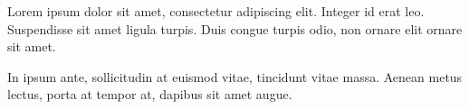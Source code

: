 \documentclass{article}
\begin{document}
	Lorem ipsum dolor sit amet, consectetur adipiscing elit. Integer id erat leo. Suspendisse sit amet ligula turpis.
	Duis congue turpis odio, non ornare elit ornare sit amet. %
	
	In ipsum ante, sollicitudin at euismod vitae, tincidunt vitae massa. Aenean metus lectus, porta at tempor at, dapibus sit amet augue.
	
\end{document}
